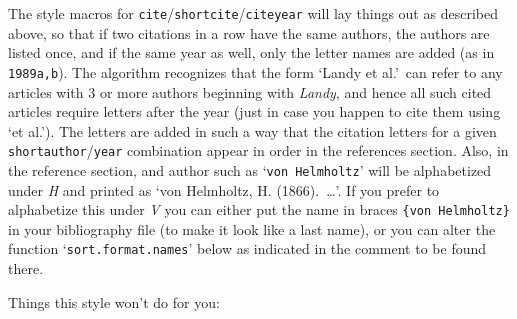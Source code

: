 \documentclass[DIV=9, parskip=half, pagesize=auto]{scrartcl}
\makeatletter
\newcommand*{\cs}[1]{\texttt{\textbackslash#1}}
\newcommand*{\cmd}[1]{\cs{\expandafter\@gobble\string#1}}
\makeatother
\begin{document}
The style macros for \texttt{cite}/\texttt{shortcite}/\texttt{citeyear} will lay things out as
described above, so that if two citations in a row have the same authors,
the authors are listed once, and if the same year as well, only the letter
names are added (as in \texttt{1989a,b})\@.  The algorithm recognizes that the form
`Landy et al.'\ can refer to any articles with 3 or more authors beginning
with \textsl{Landy}, and hence all such cited articles require letters after the year
(just in case you happen to cite them using `et al.')\@.  The letters are
added in such a way that the citation letters for a given \texttt{shortauthor}/\texttt{year}
combination appear in order in the references section.  Also, in the reference
section, and author such as `\verb+von Helmholtz+' will be alphabetized under \textsl{H}
and printed as `von Helmholtz, H. (1866).\ \ldots'\@.  If you prefer to
alphabetize this under \textsl{V} you can either put the name in braces \verb+{von Helmholtz}+
in your bibliography file (to make it look like a last name), or you can
alter the function `\texttt{sort.format.names}' below as indicated in the comment to
be found there.

\pagebreak[2]

Things this style won't do for you:
%
\end{document}
